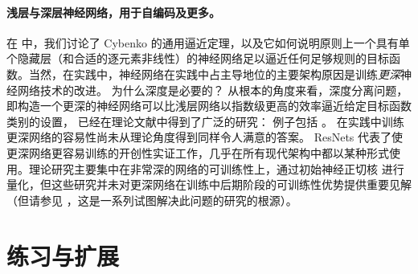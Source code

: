 \documentclass[../../book-main.tex]{subfiles}
\begin{document}
\paragraph{浅层与深层神经网络，用于自编码及更多。}
在  中，我们讨论了 Cybenko 的通用逼近定理，以及它如何说明原则上一个具有单个隐藏层（和合适的逐元素非线性）的神经网络足以逼近任何足够规则的目标函数。当然，在实践中，神经网络在实践中占主导地位的主要架构原因是训练\textit{更深}神经网络技术的改进。
为什么深度是必要的？
从根本的角度来看，深度分离问题，即构造一个更深的神经网络可以比浅层网络以指数级更高的效率逼近给定目标函数类别的设置，
已经在理论文献中得到了广泛的研究：
例子包括 \cite{Telgarsky2016-sn,Bresler2020-xy,Venturi2021-qc}。
在实践中训练更深网络的容易性尚未从理论角度得到同样令人满意的答案。
ResNets \cite{he2016deep} 代表了使更深网络更容易训练的开创性实证工作，几乎在所有现代架构中都以某种形式使用。理论研究主要集中在非常深的网络的可训练性上，通过初始神经正切核 \cite{Buchanan2021-sj,Martens2021-cx} 进行量化，但这些研究并未对更深网络在训练中后期阶段的可训练性优势提供重要见解（但请参见 \cite{Yang2021-gw}，这是一系列试图解决此问题的研究的根源）。

\section{练习与扩展}
\end{document}
